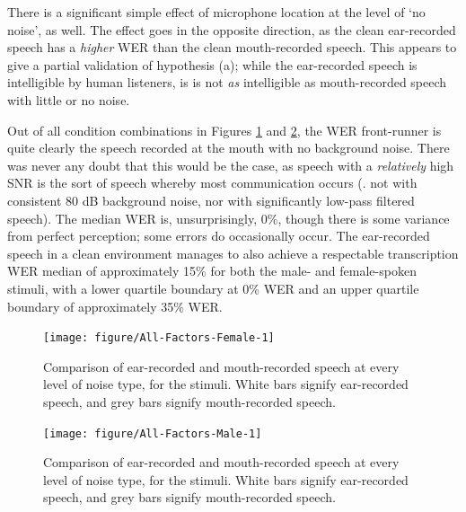 There is a significant simple effect of microphone location at the level of `no noise', as well.  The effect goes in the opposite direction, as the clean ear-recorded speech has a \textit{higher} WER than the clean mouth-recorded speech.  This appears to give a partial validation of hypothesis (a); while the ear-recorded speech is intelligible by human listeners, is is not \textit{as} intelligible as mouth-recorded speech with little or no noise.

Out of all condition combinations in Figures \ref{fig:female-split} and \ref{fig:male-split}, the WER front-runner is quite clearly the speech recorded at the mouth with no background noise.  There was never any doubt that this would be the case, as speech with a \textit{relatively} high SNR is the sort of speech whereby most communication occurs (\DIFdelbegin {}\DIFdelend \DIFaddbegin {}\DIFaddend . not with consistent 80 dB background noise, nor with significantly low-pass filtered speech).  The median WER is, unsurprisingly, 0\%, though there is some variance from perfect perception; some errors do occasionally occur. The ear-recorded speech in a clean environment manages to also achieve a respectable transcription WER median of approximately 15\% for both the male- and female-spoken stimuli, with a lower quartile boundary at 0\% WER and an upper quartile boundary of approximately 35\% WER.


\begin{figure}[h!]
\DIFaddbeginFL \centering
\DIFaddendFL 

\texttt{[image: figure/All-Factors-Female-1]} 

\caption{Comparison of ear-recorded and mouth-recorded speech at every level of noise type, for the \DIFdelbeginFL {}\DIFdelendFL \DIFaddbeginFL \textbf{}\DIFaddendFL stimuli.  White bars signify ear-recorded speech, and grey bars signify mouth-recorded speech.}\label{fig:female-split}
\end{figure}

\begin{figure}[h!]
\DIFaddbeginFL \centering
\DIFaddendFL 

\texttt{[image: figure/All-Factors-Male-1]} 

\caption{Comparison of ear-recorded and mouth-recorded speech at every level of noise type, for the \DIFdelbeginFL {}\DIFdelendFL \DIFaddbeginFL \textbf{}\DIFaddendFL stimuli.  White bars signify ear-recorded speech, and grey bars signify mouth-recorded speech.}\label{fig:male-split}
\end{figure}

